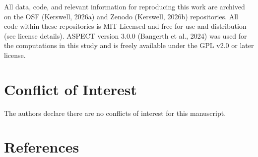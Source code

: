 \documentclass[draft,linenumbers]{agujournal2019}
\begin{document}
All data, code, and relevant information for reproducing this work are
archived on the OSF (Kerswell, 2026a) and Zenodo (Kerswell, 2026b)
repositories. All code within these repositories is MIT Licensed and
free for use and distribution (see license details). ASPECT version
3.0.0 (Bangerth et al., 2024) was used for the computations in this
study and is freely available under the GPL v2.0 or later license.

\section*{Conflict of Interest}\label{sec:conflict-of-interest}

The authors declare there are no conflicts of interest for this
manuscript.

\clearpage

\section*{References}\label{sec:references}
\end{document}
